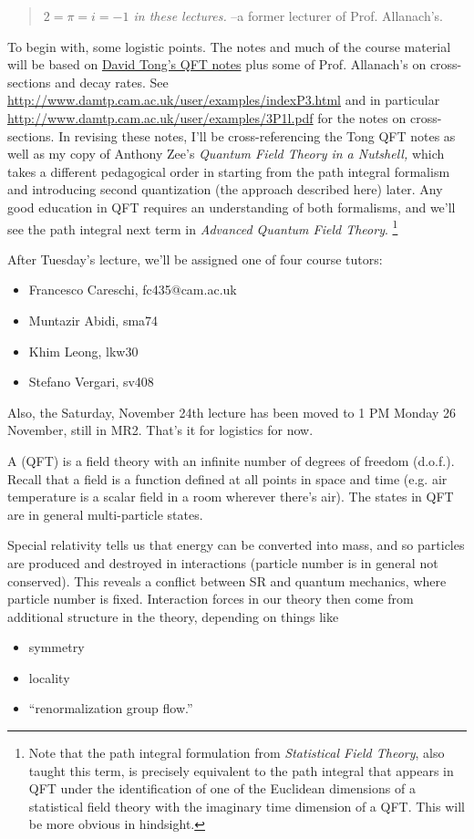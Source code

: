 \begin{quote}\textit{$2=\pi=i=-1$ in these lectures.} --a former lecturer of Prof. Allanach's.\end{quote}
To begin with, some logistic points. The notes and much of the course material will be based on \href{http://www.damtp.cam.ac.uk/user/tong/qft/qft.pdf}{David Tong's QFT notes} plus some of Prof. Allanach's on cross-sections and decay rates. See \url{http://www.damtp.cam.ac.uk/user/examples/indexP3.html} and in particular \url{http://www.damtp.cam.ac.uk/user/examples/3P1l.pdf} for the notes on cross-sections. In revising these notes, I'll be cross-referencing the Tong QFT notes as well as my copy of Anthony Zee's \textit{Quantum Field Theory in a Nutshell,} which takes a different pedagogical order in starting from the path integral formalism and introducing second quantization (the approach described here) later. Any good education in QFT requires an understanding of both formalisms, and we'll see the path integral next term in \emph{Advanced Quantum Field Theory}.%
    \footnote{Note that the path integral formulation from \emph{Statistical Field Theory}, also taught this term, is precisely equivalent to the path integral that appears in QFT under the identification of one of the Euclidean dimensions of a statistical field theory with the imaginary time dimension of a QFT. This will be more obvious in hindsight.}

After Tuesday's lecture, we'll be assigned one of four course tutors:
\begin{itemize}
    \item Francesco Careschi, fc435@cam.ac.uk
    \item Muntazir Abidi, sma74
    \item Khim Leong, lkw30
    \item Stefano Vergari, sv408
\end{itemize}
Also, the Saturday, November 24th lecture has been moved to 1 PM Monday 26 November, still in MR2. That's it for logistics for now.

\begin{defn}
A  (QFT) is a field theory with an infinite number of degrees of freedom (d.o.f.). Recall that a field is a function defined at all points in space and time (e.g. air temperature is a scalar field in a room wherever there's air). The states in QFT are in general multi-particle states.
\end{defn}
Special relativity tells us that energy can be converted into mass, and so particles are produced and destroyed in interactions (particle number is in general not conserved). This reveals a conflict between SR and quantum mechanics, where particle number is fixed. Interaction forces in our theory then come from additional structure in the theory, depending on things like
\begin{itemize}
    \item symmetry
    \item locality
    \item ``renormalization group flow.''
\end{itemize}


